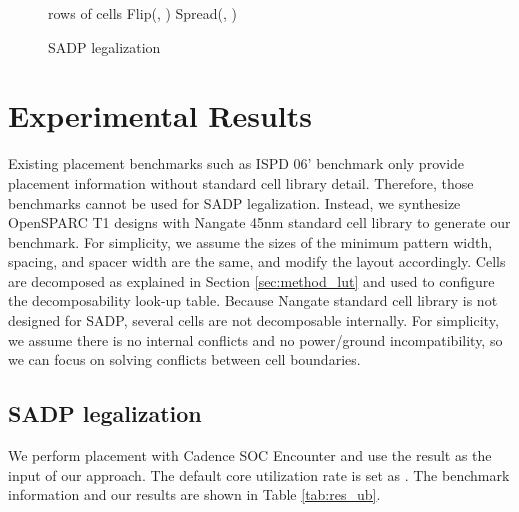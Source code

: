 \begin{figure}[h]
\center
 \begin{minipage}[t]{3.15in}
 \begin{algorithm}[H]
\caption{SADP legalization} 
\label{alg:sadp_legal} 
\begin{algorithmic}[1]
\REQUIRE  rows of cells
  \FOR {} 
      \STATE Flip(, ) \label{alg:flip}
    \ENDIF
\ENDFOR
  \FOR {} 
      \STATE Spread(, ) \label{alg:spread}
    \ENDIF
  \ENDFOR
\ENDFOR
\end{algorithmic}
\end{algorithm}
 \end{minipage}
 \iffalse
\hfill
 \begin{minipage}[t]{3.15in}
\begin{algorithm}[H]
\caption{Mission-side2 Greedy} 
\label{alg2} 
\begin{algorithmic}[1]
\STATE whatever your alg does
\FOR{each mission  in sorted order} 
\STATE do something
\ENDFOR
\end{algorithmic}
\end{algorithm}
 \end{minipage}
\hfill
\fi
\end{figure}



\section{Experimental Results} \label{sec:result}
Existing placement benchmarks such as ISPD 06' benchmark only provide placement information without standard cell library detail. Therefore, those benchmarks cannot be used for SADP legalization. Instead, we synthesize OpenSPARC T1 designs with Nangate 45nm standard cell library  \cite{nangate} to generate our benchmark. For simplicity, we assume the sizes of the minimum pattern width, spacing, and spacer width are the same, and modify the layout accordingly. Cells are decomposed as explained in Section \ref{sec:method_lut} and used to configure the decomposability look-up table.
Because Nangate standard cell library is not designed for SADP, several cells are not decomposable internally. For simplicity, we assume there is no internal conflicts and no power/ground incompatibility, so we can focus on solving conflicts between cell boundaries. 

\subsection{SADP legalization}
We perform placement with Cadence SOC Encounter \cite{socEncounter} and use the result as the input of our approach. The default core utilization rate is set as . The benchmark information and our results are shown in Table \ref{tab:res_ub}. 

